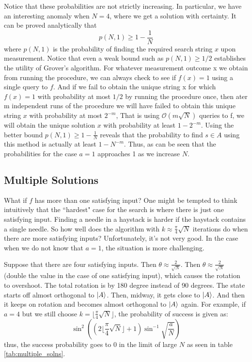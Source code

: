 Notice that these probabilities are not strictly increasing. In particular, we have an interesting anomaly when $N=4$, where we get a solution with certainty. It can be proved analytically that
\[
p(N,1)\geq 1-\dfrac{1}{N}
\]
where $p(N,1)$ is the probability of finding the required search string $x$ upon measurement. Notice that even a weak bound such as $p(N,1)\geq 1/2$ establishes the utility of Grover's algorithm. For whatever measurement outcome x we obtain from running the procedure, we can always check to see if $f(x)=1$ using a single query to $f$. And if we fail to obtain the unique string x for which $f(x)=1$ with probability at most $1/2$ by running the procedure once, then ater m independent runs of the procedure we will have failed to obtain this unique string $x$ with probability at most $2^{-m}$, That is using $\mathcal{O}(m\sqrt{N})$ queries to f, we will obtain the unique solution $x$ with probability at least $1-2^{-m}$. Using the better bound $p(N,1) \geq 1-\frac{1}{N}$ reveals that the probability to find $s \in A$ using this method is actually at least $1-N^{-m}$. Thus, as can be seen that the probabilities for the case $a=1$ approaches 1 as we increase $N$.

\subsection{Multiple Solutions}
What if $f$ has more than one satisfying input? One might be tempted to think intuitively that the ``hardest" case for the search is where there is just one satisfying input. Finding a needle in a haystack is harder if the haystack contains a single needle. So how well does the algorithm with $k\approx \frac{\pi}{4}\sqrt{N}$ iterations do when there are more satisfying inputs? Unfortunately, it's not very good. In the case when we do not know that $a=1$, the situation is more challenging.

Suppose that there are four satisfying inputs. Then $\theta \approx \frac{2}{\sqrt{N}}$. Then $\theta \approx \frac{2}{\sqrt{N}}$ (double the value in the case of one satisfying input), which causes the rotation to overshoot. The total rotation is by 180 degree instead of 90 degrees. The state starts off almost orthogonal to $\ket{A}$. Then, midway, it gets close to $\ket{A}$. And then it keeps on rotation and becomes almost orthogonal to $\ket{A}$ again.  For example, if $a=4$ but we still choose $k=\lfloor \frac{\pi}{4}\sqrt{N}\rfloor$, the probability of success is given as: 
\[
\sin^2 \left(\left(2\lfloor \frac{\pi}{4}\sqrt{N} \rfloor+1\right)\sin^{-1} \sqrt{\frac{a}{N}}\right)
\]
thus, the success probability goes to 0 in the limit of large $N$ as seen in table \ref{tab:multiple_solns}.

